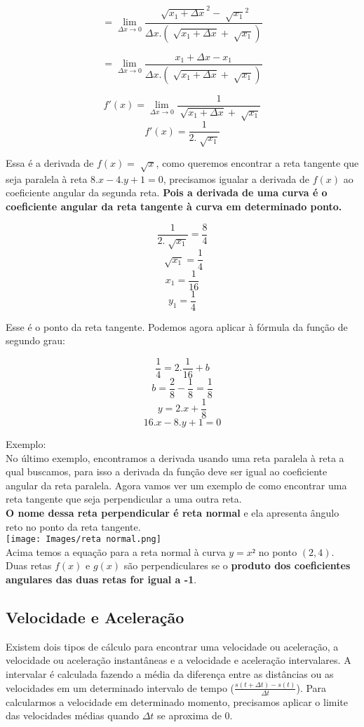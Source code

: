\documentclass[ ]{article}
\begin{document}
		$$= \lim_{\Delta x \to 0}\dfrac{\sqrt[ ]{x_1+\Delta x}^2-\sqrt[ ]{x_1}^2}  {\Delta x.(\sqrt[ ]{x_1 + \Delta x}+ \sqrt[ ]{x_1})}$$		
		
		$$= \lim_{\Delta x \to 0}\dfrac{x_1+\Delta x-x_1}{\Delta x.(\sqrt[ ]{x_1 + \Delta x}+ \sqrt[ ]{x_1})}$$
		
		$$f'(x) = \lim_{\Delta x\to 0}\dfrac{1}{\sqrt[ ]{x_1+\Delta x}+ \sqrt[ ]{x_1}}$$
		$$f'(x) = \dfrac{1}{2.\sqrt[ ]{x_1}}$$
		
		Essa é a derivada de $f(x) = \sqrt[ ]{x}$, como queremos encontrar a reta tangente que seja paralela à reta $8.x-4.y+1=0$, precisamos igualar a derivada de $f(x)$ ao coeficiente angular da segunda reta. \textbf{Pois a derivada de uma curva é o coeficiente angular da reta tangente à curva em determinado ponto.}
		
		$$\dfrac{1}{2.\sqrt[ ]{x_1}}=\dfrac{8}{4}$$
		$$\sqrt[ ]{x_1}=\dfrac{1}{4}$$
		$$x_1 = \dfrac{1}{16}$$
		$$y_1 = \dfrac{1}{4}$$

		Esse é o ponto da reta tangente. Podemos agora aplicar à fórmula da função de segundo grau:

		$$\dfrac{1}{4}=2.\dfrac{1}{16}+b$$
		$$b =\dfrac{2}{8}-\dfrac{1}{8}=\dfrac{1}{8}$$
		$$y=2.x+\dfrac{1}{8}$$
		$$16.x-8.y+1=0$$
		
		Exemplo:\\
		No último exemplo, encontramos a derivada usando uma reta paralela à reta a qual buscamos, para isso a derivada da função deve ser igual ao coeficiente angular da reta paralela. Agora vamos ver um exemplo de como encontrar uma reta tangente que seja perpendicular a uma outra reta.\\
		\textbf{O nome dessa reta perpendicular é reta normal} e ela apresenta ângulo reto no ponto da reta tangente.\\
		\texttt{[image: Images/reta normal.png]}
		\\
		Acima temos a equação para a reta normal à curva $y = x²$ no ponto $(2,4)$.\\
		Duas retas $f(x)$ e $g(x)$ são perpendiculares se o \textbf{produto dos coeficientes angulares das duas retas for igual a -1}.
		
	\subsection{Velocidade e Aceleração}
		Existem dois tipos de cálculo para encontrar uma velocidade ou aceleração, a velocidade ou aceleração instantâneas e a velocidade e aceleração intervalares. A intervalar é calculada fazendo a média da diferença entre as distâncias ou as velocidades em um determinado intervalo de tempo ($\frac{s(t+\Delta t)-s(t)}{\Delta t}$). Para calcularmos a velocidade em determinado momento, precisamos aplicar o limite das velocidades médias quando $\Delta t$ se aproxima de 0.
		
\end{document}
